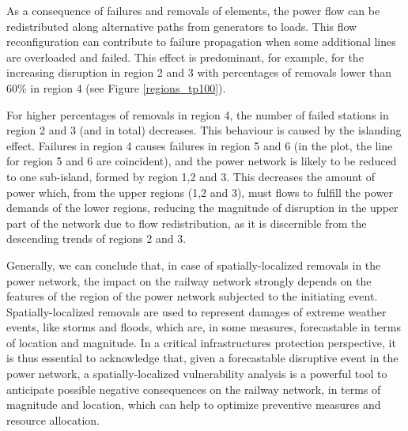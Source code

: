 \documentclass[review]{elsarticle}
\begin{document}
	As a consequence of failures and removals of elements, the power flow can be redistributed along alternative paths from generators to loads. This flow reconfiguration can contribute to failure propagation when some additional lines are overloaded and failed. This effect is predominant, for example, for the increasing disruption in region 2 and 3 with percentages of removals lower than 60\% in region 4 (see Figure \ref{regions_tp100}).
	
	For higher percentages of removals in region 4, the number of failed stations in region 2 and 3 (and in total) decreases. This behaviour is caused by the islanding effect. Failures in region 4 causes failures in region 5 and 6 (in the plot, the line for region 5 and 6 are coincident), and the power network is likely to be reduced to one sub-island, formed by region 1,2 and 3. This decreases the amount of power which, from the upper regions (1,2 and 3), must flows to fulfill the power demands of the lower regions, reducing the magnitude of disruption in the upper part of the network due to flow redistribution, as it is discernible from the descending trends of regions 2 and 3.
	
	Generally, we can conclude that, in case of spatially-localized removals in the power network, the impact on the railway network strongly depends on the features of the region of the power network subjected to the initiating event. Spatially-localized removals are used to represent damages of extreme weather events, like storms and floods, which are, in some measures, forecastable in terms of location and magnitude. In a critical infrastructures protection perspective, it is thus essential to acknowledge that, given a forecastable disruptive event in the power network, a spatially-localized vulnerability analysis is a powerful tool to anticipate possible negative consequences on the railway network, in terms of magnitude and location, which can help to optimize preventive measures and resource allocation.

\end{document}
